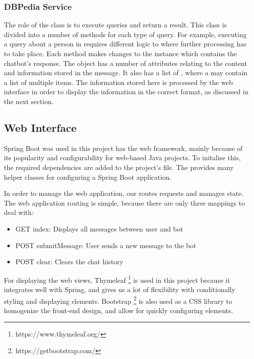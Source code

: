 \subsubsection{DBPedia Service}
The role of the  class is to execute queries and return a result. This class is divided into a number of methods for each type of query. For example, executing a query about a person in  requires different logic to  where further processing has to take place. Each method makes changes to the  instance which contains the chatbot's response. The  object has a number of attributes relating to the content and information stored in the message. It also has a list of , where a  may contain a list of multiple items. The information stored here is processed by the web interface in order to display the information in the correct format, as discussed in the next section.

\subsection{Web Interface}
Spring Boot \cite{springmanual} was used in this project has the web framework, mainly because of its popularity and configurability for web-based Java projects. To initalise this, the required dependencies are added to the project's  file. The  provides many helper classes for configuring a Spring Boot application.

In order to manage the web application, our  routes requests and manages state. The web application routing is simple, because there are only three mappings to deal with:
\begin{itemize}
	\item GET index: Displays all messages between user and bot
	\item POST submitMessage: User sends a new message to the bot
	\item POST clear: Clears the chat history
\end{itemize}

For displaying the web views, Thymeleaf \footnote{https://www.thymeleaf.org/} is used in this project because it integrates well with Spring, and gives us a lot of flexibility with conditionally styling and displaying elements. Bootstrap \footnote{https://getbootstrap.com/} is also used as a CSS library to homogenize the front-end design, and allow for quickly configuring elements.


